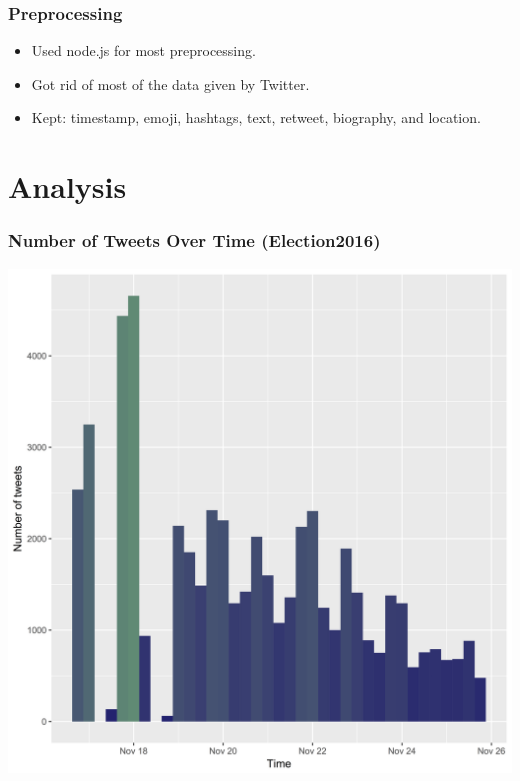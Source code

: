 \documentclass{beamer}
\begin{document}
\begin{frame}
	\frametitle{Preprocessing}
	\begin{itemize}
    \item Used node.js for most preprocessing.
    \newline
    \item Got rid of most of the data given by Twitter.
    \newline
    \item Kept: timestamp, emoji, hashtags, text, retweet, biography, and location.
    \newline
	\end{itemize}
\end{frame}

\section{Analysis} %

\begin{frame}
	\frametitle{Number of Tweets Over Time (Election2016)}
  \includegraphics[height = 0.9\textheight]{e2016freq}
\end{frame}
\end{document}
